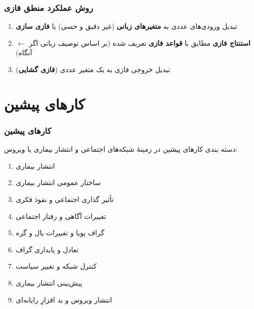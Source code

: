 \documentclass[xcolor=dvipsnames, professionalfonts, aspectratio=169, 11pt]{beamer}
\begin{document}
\begin{frame}
    \frametitle{روش عملکرد منطق فازی}

    \begin{enumerate}\RTList
        \item تبدیل ورودی‌های عددی به \textbf{متغیرهای زبانی} (غیر دقیق و حسی) یا \textbf{فازی سازی}
        \item \textbf{استنتاج فازی} مطابق با \textbf{قواعد فازی} تعریف شده (بر اساس توصیف زبانی اگر $\leftarrow$ آنگاه)
        \item تبدیل خروجی فازی به یک متغیر عددی (\textbf{فازی گشایی})
    \end{enumerate}

\end{frame}

\section{کارهای پیشین}
\begin{frame}
    \frametitle{کارهای پیشین}

    دسته بندی کارهای پیشین در زمینهٔ شبکه‌های اجتماعی و انتشار بیماری  یا ویروس:
    {
    \begin{enumerate}\RTList
        \item<1-2> انتشار بیماری
        \item ساختار عمومی انتشار بیماری
        \item تأثیر گذاری اجتماعی و نفوذ فکری
        \item تغییرات آگاهی و رفتار اجتماعی
        \item<1> گراف پویا و تغییرات یال و گره
        \item<1> تعادل و پایداری گراف
        \item<1> کنترل شبکه و تغییر سیاست
        \item<1> پیش‌بینی انتشار بیماری
        \item<1> انتشار ویروس و بد افزارِ رایانه‌ای

    \end{enumerate}
    }
\end{frame}
\end{document}
